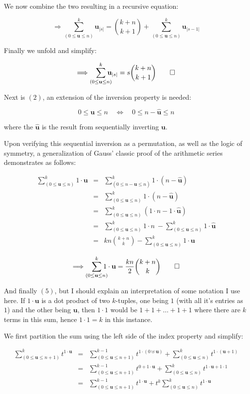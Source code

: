 \documentclass[twoside]{amsart}
\newcommand{\bu}[1][u]{\ensuremath{\mathbf #1}}
\begin{document}
We now combine the two resulting in a recursive equation:

$$  \Longrightarrow\sum_{(0\le\bu\le n)}^{k}\!\!\!\!\! \bu_{|s|}
     ={k+n\choose k+1}+\sum_{(0\le\bu\le n)}^{k}\!\!\!\!\! \bu_{|s-1|}  $$

Finally we unfold and simplify:

$$  \Longrightarrow\sum_{(0\le\bu\le n)}^{k}\!\!\!\!\! \bu_{|s|}
     =s{k+n\choose k+1}\qed  $$

Next is $  (2)  $, an extension of the inversion property is needed:

$$ 0\le\bu\le n\quad\Longleftrightarrow\quad 0\le n-\hat{\bu}\le n $$

where the $ \hat{\bu} $ is the result from sequentially inverting $ \bu $.

\newpage

Upon verifying this sequential inversion as a permutation, as well as the logic of symmetry,
a generalization of Gauss' classic proof of the arithmetic series demonstrates as follows:

\begin{eqnarray*}
\sum_{(0\le\bu\le n)}^k\!\!\!\!\! 1\cdot\bu  
 & = & \sum_{(0\le n-\hat{\bu}\le n)}^k\!\!\!\!\! 1\cdot(n-\hat{\bu})      \\ 
 & = & \sum_{(0\le\bu\le n)}^k\!\!\!\! 1\cdot(n-\hat{\bu})  \\
 & = & \sum_{(0\le\bu\le n)}^k\!\!\!\!\! (1\cdot n-1\cdot\hat{\bu})  \\
 & = & \sum_{(0\le\bu\le n)}^k\!\!\!\!\! 1\cdot n
       \ -\sum_{(0\le\bu\le n)}^k\!\!\!\!\! 1\cdot\hat{\bu}            \\
 & = & kn{k+n\choose k}-\sum_{(0\le\bu\le n)}^k\!\!\!\!\! 1\cdot\bu        \\
\end{eqnarray*} 
$$  \Longrightarrow\sum_{(0\le\bu\le n)}^k\!\!\!\!\! 1\cdot\bu
    =\frac{kn}{2}{k+n\choose k}\qed  $$

And finally $  (5)  $, but I should explain an interpretation of some notation I use here.
If $ 1\cdot\bu $ is a dot product of two $ k $-tuples, one being $ 1 $ (with all it's entries as $ 1 $)
and the other being $ \bu $, then $ 1\cdot 1 $ would be $ 1+1+\ldots+1+1 $ where there are $ k $ terms
in this sum, hence $ 1\cdot 1=k $ in this instance.

We first partition the sum using the left side of the index property and simplify:

\begin{eqnarray*}
\sum_{(0\le\bu\le n+1)}^k\!\!\!\!\! t^{1\cdot\bu}           
 & = & \sum_{(0\le\bu\le n+1)}^{k-1}\!\!\!\!\! t^{1\cdot(0\uplus\bu)}
       +\sum_{(0\le\bu\le n)}^k\!\!\!\!\! t^{1\cdot(\bu+1)}                \\
 & = & \sum_{(0\le\bu\le n+1)}^{k-1}\!\!\!\!\! t^{0+1\cdot\bu}               
       +\sum_{(0\le\bu\le n)}^k\!\!\!\!\! t^{1\cdot\bu+1\cdot1}            \\
 & = & \sum_{(0\le\bu\le n+1)}^{k-1}\!\!\!\!\! t^{1\cdot\bu}              
       +t^k\sum_{(0\le\bu\le n)}^k\!\!\!\!\! t^{1\cdot\bu}                 \\
\end{eqnarray*} 
\end{document}
